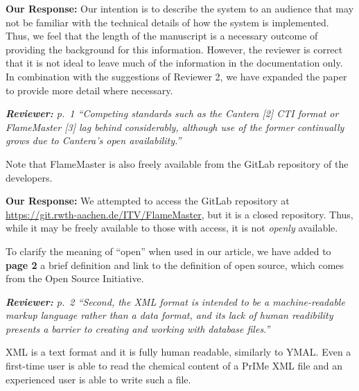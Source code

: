 \documentclass[a4paper,10pt]{elsarticle}
\newenvironment{reviewer}{\vspace{0.5\baselineskip}\begingroup\itshape\textbf{Reviewer:}}{\endgroup}
\newenvironment{response}{\textbf{Our Response:}}{\vspace{0.5\baselineskip}}
\begin{document}
\begin{response}
    Our intention is to describe the system to an audience that may not be familiar with the
    technical details of how the system is implemented. Thus, we feel that the length of the
    manuscript is a necessary outcome of providing the background for this information. However, the
    reviewer is correct that it is not ideal to leave much of the information in the documentation
    only. In combination with the suggestions of Reviewer 2, we have expanded the paper to provide
    more detail where necessary.
\end{response}

\begin{reviewer}
    p.~1 ``Competing standards such as the Cantera [2] CTI format or FlameMaster [3] lag behind
    considerably, although use of the former continually grows due to Cantera's open availability.''

    Note that FlameMaster is also freely available from the GitLab repository of the developers.
\end{reviewer}

\begin{response}
    We attempted to access the GitLab repository at \url{https://git.rwth-aachen.de/ITV/FlameMaster}, but
    it is a closed repository. Thus, while it may be freely available to those with access, it is not
    \emph{openly} available.

    To clarify the meaning of ``open'' when used in our article, we have added to \textbf{page 2} a
    brief definition and link to the definition of open source, which comes from the
    Open Source Initiative.
\end{response}

\begin{reviewer}
    p.~2 ``Second, the XML format is intended to be a machine-readable markup language rather than a
    data format, and its lack of human readibility presents a barrier to creating and working with
    database files.''

    XML is a text format and it is fully human readable, similarly to YMAL. Even a
    first-time user is able to read the chemical content of a  PrIMe XML file and an experienced
    user is able to write such a file.
\end{reviewer}
\end{document}
